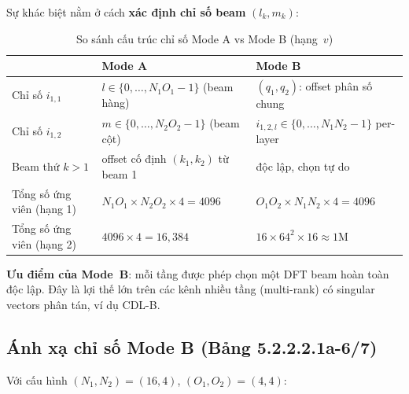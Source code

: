 \documentclass[11pt,a4paper]{article}
\begin{document}
\medskip
Sự khác biệt nằm ở cách \textbf{xác định chỉ số beam} $(l_k, m_k)$:

\begin{table}[H]
\centering
\caption{So sánh cấu trúc chỉ số Mode A vs Mode B (hạng~$v$)}
\begin{tabular}{p{3cm}p{5.5cm}p{5.5cm}}
\toprule
 & \textbf{Mode A} & \textbf{Mode B} \\
\midrule
Chỉ số $i_{1,1}$ & $l \in \{0,\ldots,N_1 O_1{-}1\}$ (beam hàng) & $(q_1, q_2)$: offset phân số chung \\
Chỉ số $i_{1,2}$ & $m \in \{0,\ldots,N_2 O_2{-}1\}$ (beam cột) & $i_{1,2,l} \in \{0,\ldots,N_1 N_2{-}1\}$ per-layer \\
Beam thứ $k>1$ & offset cố định $(k_1,k_2)$ từ beam 1 & độc lập, chọn tự do \\
Tổng số ứng viên (hạng 1) & $N_1 O_1 \times N_2 O_2 \times 4 = 4096$ & $O_1 O_2 \times N_1 N_2 \times 4 = 4096$ \\
Tổng số ứng viên (hạng 2) & $4096 \times 4 = 16{,}384$ & $16 \times 64^2 \times 16 \approx 1\text{M}$ \\
\bottomrule
\end{tabular}
\end{table}

\noindent\textbf{Ưu điểm của Mode~B}: mỗi tầng được phép chọn một DFT beam
hoàn toàn độc lập. Đây là lợi thế lớn trên các kênh nhiều tầng
(multi-rank) có singular vectors phân tán, ví dụ CDL-B.

\subsection{Ánh xạ chỉ số Mode B (Bảng 5.2.2.2.1a-6/7)}

Với cấu hình $(N_1, N_2) = (16, 4)$, $(O_1, O_2) = (4, 4)$:
\end{document}
